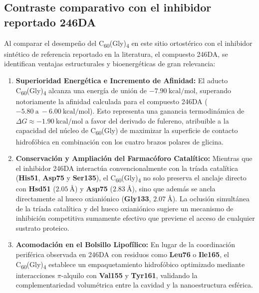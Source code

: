\subsection{Contraste comparativo con el inhibidor reportado 246DA}

Al comparar el desempeño del C\textsubscript{60}(Gly)\textsubscript{4} en este sitio ortostérico con el inhibidor sintético de referencia reportado en la literatura, el compuesto 246DA, se identifican ventajas estructurales y bioenergéticas de gran relevancia:

\begin{enumerate}
    \item \textbf{Superioridad Energética e Incremento de Afinidad:} El aducto C\textsubscript{60}(Gly)\textsubscript{4} alcanza una energía de unión de $-7.90\ \text{kcal/mol}$, superando notoriamente la afinidad calculada para el compuesto 246DA ($-5.80\ \text{a}\ -6.00\ \text{kcal/mol}$). Esto representa una ganancia termodinámica de $\Delta G \approx -1.90\ \text{kcal/mol}$ a favor del derivado de fulereno, atribuible a la capacidad del núcleo de C\textsubscript{60}(Gly) de maximizar la superficie de contacto hidrofóbica en combinación con los cuatro brazos polares de glicina.
    
    \item \textbf{Conservación y Ampliación del Farmacóforo Catalítico:} Mientras que el inhibidor 246DA interactúa convencionalmente con la tríada catalítica (\textbf{His51}, \textbf{Asp75} y \textbf{Ser135}), el C\textsubscript{60}(Gly)\textsubscript{4} no solo preserva el anclaje directo con \textbf{Hsd51} ($2.05\ \text{\AA}$) y \textbf{Asp75} ($2.83\ \text{\AA}$), sino que además se ancla directamente al hueco oxianiónico (\textbf{Gly133}, $2.07\ \text{\AA}$). La oclusión simultánea de la tríada catalítica y del hueco oxianiónico sugiere un mecanismo de inhibición competitiva sumamente efectivo que previene el acceso de cualquier sustrato proteico.
    
    \item \textbf{Acomodación en el Bolsillo Lipofílico:} En lugar de la coordinación periférica observada en 246DA con residuos como \textbf{Leu76} o \textbf{Ile165}, el C\textsubscript{60}(Gly)\textsubscript{4} establece un empaquetamiento hidrofóbico optimizado mediante interacciones $\pi$-alquilo con \textbf{Val155} y \textbf{Tyr161}, validando la complementariedad volumétrica entre la cavidad y la nanoestructura esférica.
\end{enumerate}

